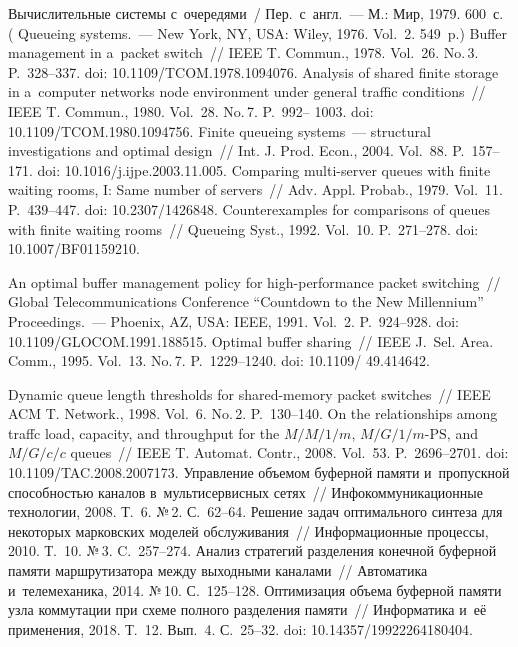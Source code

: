 \begin{multicols}{2}
{\small\frenchspacing
 { %
 \begin{thebibliography}{99}
 Вы\-чис\-ли\-тель\-ные сис\-те\-мы с~очередями~/ Пер.\ с~англ.~--- М.: Мир, 
1979. 600~с. ( Queueing systems.~--- New York, NY, USA: 
Wiley, 1976. Vol.~2. 549~p.)
 Buffer management in a~packet switch~// IEEE T. Commun., 1978. Vol.~26. 
No.\,3. P.~328--337. doi: 10.1109/TCOM.1978.1094076.
 Analysis of shared finite storage in a~computer networks node 
environment under general traffic conditions~// IEEE T. Commun., 1980. Vol.~28. No.\,7. P.~992--
1003. doi: 10.1109/TCOM.1980.1094756.
 Finite queueing systems~--- structural investigations and optimal 
design~// Int. J. Prod. Econ., 2004. Vol.~88. P.~157--171. doi: 10.1016/j.ijpe.2003.11.005.
 Comparing multi-server queues with finite waiting rooms, I: Same number of 
servers~// Adv. Appl. Probab., 1979. Vol.~11. P.~439--447. doi: 10.2307/1426848.
 Counterexamples for comparisons of queues with finite waiting rooms~// Queueing 
Syst., 1992. Vol.~10. P.~271--278. doi: 10.1007/BF01159210.

 An optimal buffer management policy for  
high-performance packet switching~// Global Telecommunications Conference ``Countdown to the New Millennium'' Proceedings.~--- Phoenix, AZ, USA: 
IEEE, 1991. Vol.~2. P.~924--928. doi: 10.1109/\mbox{GLOCOM}.1991.188515.
 Optimal buffer sharing~// IEEE J.~Sel. 
Area. Comm., 1995. Vol.~13. No.\,7. P.~1229--1240. doi: 10.1109/ 49.414642.

 Dynamic queue length thresholds for shared-memory packet 
switches~// IEEE ACM T. Network., 1998. Vol.~6. No.\,2. P.~130--140. 
 On the relationships among traffc load, capacity, and throughput for the $M/M/1/m$, 
$M/G/1/m\mbox{-}\mathrm{PS}$, and $M/G/c/c$ queues~// IEEE T. Automat. Contr., 2008. Vol.~53. 
P.~2696--2701. doi: 10.1109/TAC.2008.2007173.
 Управ\-ле\-ние объемом буферной памяти и~про\-пуск\-ной спо\-соб\-ностью 
каналов в~муль\-ти\-сер\-вис\-ных сетях~// Инфокоммуникационные технологии, 2008. Т.~6. №\,2. 
С.~62--64. 
 Решение задач оптимального син\-те\-за для некоторых марковских 
моделей обслуживания~// Информационные процессы, 2010. Т.~10. №\,3. C.~257--274.
 Анализ стратегий разделения конечной буферной памяти маршрутизатора 
меж\-ду выходными каналами~// Автоматика и~телемеханика, 2014. №\,10. С.~125--128. 
 Оптимизация объема буферной памяти уз\-ла коммутации при схеме 
пол\-но\-го раз\-де\-ле\-ния памяти~// Информатика и~её применения, 2018. Т.~12. Вып.~4.  
С.~25--32. doi: 10.14357/19922264180404.


\end{thebibliography}}}
\end{multicols}
